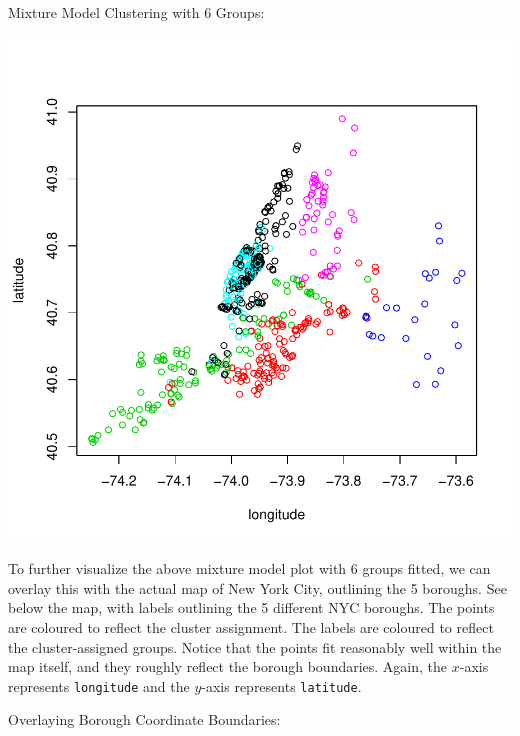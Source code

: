 \documentclass[11pt, a4paper]{article}
\begin{document}
\begin{Schunk}
\begin{Soutput}
Mixture Model Clustering with 6 Groups:
\end{Soutput}
\end{Schunk}
\includegraphics{project_report-019}






To further visualize the above mixture model plot with 6 groups fitted, we can overlay this with the actual map of New York City, outlining the 5 boroughs. See below the map, with labels outlining the 5 different NYC boroughs. The points are coloured to reflect the cluster assignment. The labels are coloured to reflect the cluster-assigned groups. Notice that the points fit reasonably well within the map itself, and they roughly reflect the borough boundaries. Again, the $x$-axis represents \texttt{longitude} and the $y$-axis represents \texttt{latitude}.

\begin{Schunk}
\begin{Soutput}
Overlaying Borough Coordinate Boundaries:
\end{Soutput}
\end{Schunk}
\end{document}
